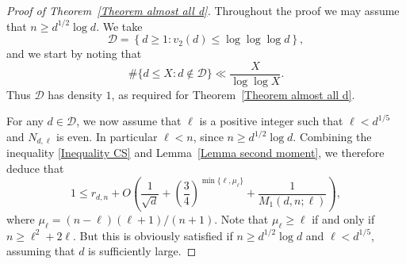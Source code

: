 \documentclass[11pt, reqno]{amsart}
\numberwithin{equation}{section}
\renewcommand{\leq}{\leqslant}
\renewcommand{\geq}{\geqslant}
\begin{document}
\begin{proof}[Proof of Theorem~\ref{Theorem almost all d}]

Throughout the proof we may assume that 
$n \geq d^{1/2}
\log d$. 
We take
\begin{equation*}
\mathcal{D} = \left\{ d \geq 1 : v_2(d) \leq \log \log \log d \right\},
\end{equation*}
and we  start by noting that
\begin{equation*}
\# \{ d \leq X : d \notin \mathcal{D} \} \ll \frac{X}{\log \log X}.
\end{equation*}
Thus $\mathcal{D}$ has density $1$, as required for
Theorem~\ref{Theorem almost all d}.

For any $d \in \mathcal{D}$,
 we now assume that $\ell$ is a positive integer 
such that $ \ell < d^{1/5}$  and  $N_{d, \ell}$ is even.
In particular $\ell<n$, since $n \geq d^{1/2}
\log d$. Combining the inequality \eqref{Inequality CS} and Lemma~\ref{Lemma second moment}, we therefore deduce that
\begin{equation}
\label{Lower bound r}
1 \leq  r_{d,n} + O \left( \frac1{\sqrt{d}}+\left(\frac{3}{4}\right)^{\min\{\ell,\mu_\ell\}} +\frac1{M_1(d,n;\ell)} \right) ,
\end{equation}
where $\mu_\ell=(n-\ell)(\ell+1)/(n+1)$. Note that 
$\mu_\ell\geq \ell$ if and only if $n\geq \ell^2+2\ell$.
But this is obviously satisfied if  $n \geq d^{1/2}
\log d$ and $\ell<d^{1/5}$, assuming that $d$ is sufficiently large.


\end{proof}
\end{document}
